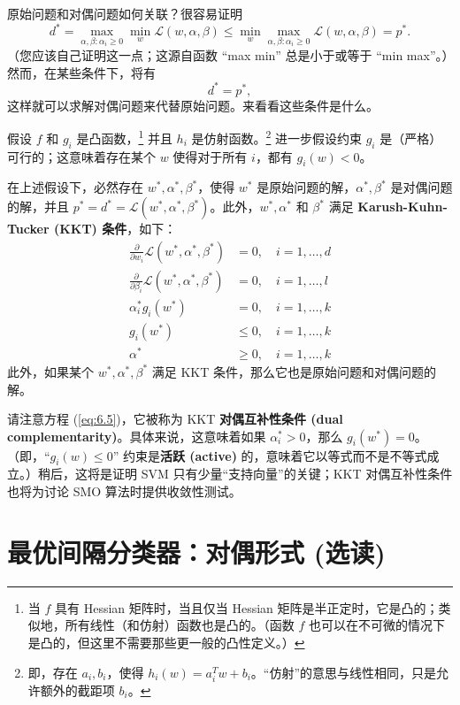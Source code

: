 原始问题和对偶问题如何关联？很容易证明
\[
    d^* = \max_{\alpha, \beta: \alpha_i \ge 0} \min_w \mathcal{L}(w, \alpha, \beta) \le \min_w \max_{\alpha, \beta: \alpha_i \ge 0} \mathcal{L}(w, \alpha, \beta) = p^*.
\]
（您应该自己证明这一点；这源自函数 “max min” 总是小于或等于 “min max”。）然而，在某些条件下，将有
\[
    d^* = p^*,
\]
这样就可以求解对偶问题来代替原始问题。来看看这些条件是什么。

假设 $f$ 和 $g_i$ 是凸函数，\footnote{当 $f$ 具有 Hessian 矩阵时，当且仅当 Hessian 矩阵是半正定时，它是凸的；类似地，所有线性（和仿射）函数也是凸的。（函数 $f$ 也可以在不可微的情况下是凸的，但这里不需要那些更一般的凸性定义。）} 并且 $h_i$ 是仿射函数。\footnote{即，存在 $a_i, b_i$，使得 $h_i(w) = a_i^T w + b_i$。“仿射”的意思与线性相同，只是允许额外的截距项 $b_i$。} 进一步假设约束 $g_i$ 是（严格）可行的；这意味着存在某个 $w$ 使得对于所有 $i$，都有 $g_i(w) < 0$。

在上述假设下，必然存在 $w^*, \alpha^*, \beta^*$，使得 $w^*$ 是原始问题的解，$\alpha^*, \beta^*$ 是对偶问题的解，并且 $p^* = d^* = \mathcal{L}(w^*, \alpha^*, \beta^*)$。此外，$w^*, \alpha^*$ 和 $\beta^*$ 满足 \textbf{Karush-Kuhn-Tucker (KKT) 条件}，如下：
\begin{align}
    \frac{\partial}{\partial w_i} \mathcal{L}(w^*, \alpha^*, \beta^*) &= 0, \quad i = 1, \dots, d \label{eq:6.3} \\
    \frac{\partial}{\partial \beta_i} \mathcal{L}(w^*, \alpha^*, \beta^*) &= 0, \quad i = 1, \dots, l \label{eq:6.4} \\
    \alpha_i^* g_i(w^*) &= 0, \quad i = 1, \dots, k \label{eq:6.5} \\
    g_i(w^*) &\le 0, \quad i = 1, \dots, k \label{eq:6.6} \\
    \alpha^* &\ge 0, \quad i = 1, \dots, k \label{eq:6.7}
\end{align}
此外，如果某个 $w^*, \alpha^*, \beta^*$ 满足 KKT 条件，那么它也是原始问题和对偶问题的解。

请注意方程 (\ref{eq:6.5})，它被称为 KKT \textbf{对偶互补性条件 (dual complementarity)}。具体来说，这意味着如果 $\alpha_i^* > 0$，那么 $g_i(w^*) = 0$。（即，“$g_i(w) \le 0$” 约束是\textbf{活跃 (active)} 的，意味着它以等式而不是不等式成立。）稍后，这将是证明 SVM 只有少量“支持向量”的关键；KKT 对偶互补性条件也将为讨论 SMO 算法时提供收敛性测试。

\section{最优间隔分类器：对偶形式 (选读)}

